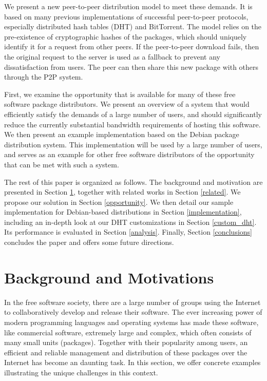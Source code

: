 \documentclass[conference]{IEEEtran}
\begin{document}
We present a new peer-to-peer distribution model to meet these
demands. It is based on many previous implementations of successful
peer-to-peer protocols, especially distributed hash tables (DHT) and
BitTorrent. The model relies on the pre-existence of cryptographic
hashes of the packages, which should uniquely identify it for a
request from other peers. If the peer-to-peer download fails, then
the original request to the server is used as a fallback to prevent
any dissatisfaction from users. The peer can then share this new
package with others through the P2P system.

First, we examine the opportunity that is available for many of
these free software package distributors. We present an overview of
a system that would efficiently satisfy the demands of a large
number of users, and should significantly reduce the currently
substantial bandwidth requirements of hosting this software. We then
present an example implementation based on the Debian package
distribution system. This implementation will be used by a large
number of users, and serves as an example for other free software
distributors of the opportunity that can be met with such a system.

The rest of this paper is organized as follows. The background and motivation are presented in Section \ref{situation}, together with related works in  Section \ref{related}. We propose
our solution in Section \ref{opportunity}. We then detail our sample
implementation for Debian-based distributions in Section
\ref{implementation}, including an in-depth look at our DHT
customizations in Section \ref{custom_dht}. Its performance is evaluated in Section \ref{analysis}. Finally, 
Section \ref{conclusions} concludes the paper and offers some future directions.


\section{Background and Motivations}
\label{situation}

In the free software society, there are a large number of groups using the Internet to 
collaboratively develop and release their software. The ever increasing power of
modern programming languages and operating systems has made these software, like commercial software, extremely large and complex, which often
consists of many small units (packages). Together with their popularity among users, 
an efficient and reliable management and distribution of these packages over the Internet has become an daunting task. In this section, we offer concrete examples illustrating the 
unique challenges in this context. 
\end{document}
